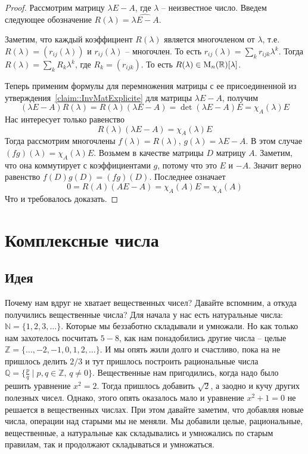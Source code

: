 \begin{proof}
Рассмотрим матрицу $\lambda E - A$, где $\lambda$ -- неизвестное число.
Введем следующее обозначение $R(\lambda) = \widehat{\lambda E - A}$.

Заметим, что каждый коэффициент $R(\lambda)$ является многочленом от $\lambda$, т.е. $R(\lambda) = (r_{ij}(\lambda))$ и $r_{ij}(\lambda)$ -- многочлен.
То есть $r_{ij}(\lambda) = \sum_k r_{ijk}\lambda^k$.
Тогда $R(\lambda) = \sum_k R_k \lambda^k$, где $R_k=(r_{ijk})$.
То есть $R(\lambda)\in\operatorname{M}_{n}(\mathbb R)[\lambda]$.

Теперь применим формулы для перемножения матрицы с ее присоединенной из утверждения~\ref{claim::InvMatExplicite} для матрицы $\lambda E - A$, получим 
\[
(\lambda E - A)R(\lambda) = R(\lambda)(\lambda E - A) = \det(\lambda E - A)E=\chi_A(\lambda)E
\]
Нас интересует только равенство
\[
R(\lambda)(\lambda E - A) = \chi_A(\lambda)E
\]
Тогда рассмотрим многочлены $f(\lambda) = R(\lambda)$, $g(\lambda) = \lambda E  - A$.
В этом случае $(fg)(\lambda) = \chi_A(\lambda)E$.
Возьмем в качестве матрицы $D$ матрицу $A$.
Заметим, что она коммутирует с коэффициентами $g$, потому что это $E$ и $-A$.
Значит верно равенство $f(D)g(D) = (fg)(D)$.
Последнее означает
\[
0 = R(A)(A E - A) = \chi_A(A) E = \chi_A(A)
\]
Что и требовалось доказать.
\end{proof}


\newpage
\section{Комплексные числа}

\subsection{Идея}

Почему нам вдруг не хватает вещественных чисел?
Давайте вспомним, а откуда получились вещественные числа?
Для начала у нас есть натуральные числа: $\mathbb N = \{1,2,3,\ldots\}$.
Которые мы беззаботно складывали и умножали.
Но как только нам захотелось посчитать $5 - 8$, как нам понадобились другие числа -- целые $\mathbb Z = \{\ldots, -2, -1,0,1,2,\ldots\}$.
И мы опять жили долго и счастливо, пока на не пришлось делить $2/3$ и тут пришлось построить рациональные числа $\mathbb Q = \{\frac{p}{q}\mid p,q\in \mathbb Z,\, q\neq 0\}$.
Вещественные нам пригодились, когда надо было решить уравнение $x^2 = 2$.
Тогда пришлось добавить $\sqrt{2}$, а заодно и кучу других полезных чисел.
Однако, этого опять оказалось мало и уравнение $x^2 +1 = 0$ не решается в вещественных числах.
При этом давайте заметим, что добавляя новые числа, операции над старыми мы не меняли.
Мы добавили целые, рациональные, вещественные, а натуральные как складывались и умножались по старым правилам, так и продолжают складываться и умножаться.

